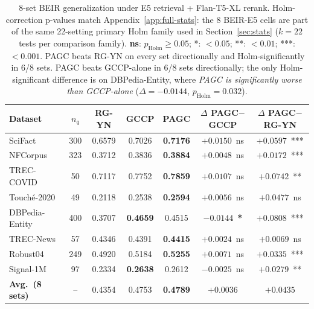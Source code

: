 \documentclass[sigconf]{acmart}
\begin{document}
\begin{table}[t]
\centering
\small
\setlength{\tabcolsep}{4pt}
\begin{tabular}{lcccccc}
\toprule
\textbf{Dataset} & \textbf{$n_q$} & \textbf{RG-YN} & \textbf{GCCP} & \textbf{PAGC}
& \textbf{$\Delta$ PAGC$-$GCCP} & \textbf{$\Delta$ PAGC$-$RG-YN} \\
\midrule
SciFact          & 300 & 0.6579 & 0.7026 & \textbf{0.7176} & $+0.0150$~ns   & $+0.0597$~*** \\
NFCorpus         & 323 & 0.3712 & 0.3836 & \textbf{0.3884} & $+0.0048$~ns   & $+0.0172$~*** \\
TREC-COVID       &  50 & 0.7117 & 0.7752 & \textbf{0.7859} & $+0.0107$~ns   & $+0.0742$~**  \\
Touch\'e-2020    &  49 & 0.2118 & 0.2538 & \textbf{0.2594} & $+0.0056$~ns   & $+0.0477$~ns  \\
DBPedia-Entity   & 400 & 0.3707 & \textbf{0.4659} & 0.4515 & $-0.0144$~\textbf{*} & $+0.0808$~*** \\
TREC-News        &  57 & 0.4346 & 0.4391 & \textbf{0.4415} & $+0.0024$~ns   & $+0.0069$~ns  \\
Robust04         & 249 & 0.4920 & 0.5184 & \textbf{0.5255} & $+0.0071$~ns   & $+0.0335$~*** \\
Signal-1M        &  97 & 0.2334 & \textbf{0.2638} & 0.2612 & $-0.0025$~ns   & $+0.0279$~**  \\
\midrule
\textbf{Avg.\ (8 sets)} & -- & 0.4354 & 0.4753 & \textbf{0.4789} & $+0.0036$ & $+0.0435$ \\
\bottomrule
\end{tabular}
\caption{8-set BEIR generalization under E5 retrieval +
Flan-T5-XL rerank. Holm-correction p-values match
Appendix~\ref{app:full-stats}: the 8 BEIR-E5 cells are part of the
same 22-setting primary Holm family used in
Section~\ref{sec:stats} ($k=22$ tests per comparison family).
\textbf{ns}: $p_{\text{Holm}}\geq 0.05$; *: $<0.05$;
**: $<0.01$; ***: $<0.001$. PAGC beats RG-YN on every set
directionally and Holm-significantly in 6/8 sets. PAGC beats
GCCP-alone in 6/8 sets directionally; the only Holm-significant
difference is on DBPedia-Entity, where \emph{PAGC is significantly
worse than GCCP-alone} ($\Delta=-0.0144$, $p_{\text{Holm}}{=}0.032$).}
\label{tab:beir-e5}
\end{table}
\end{document}
